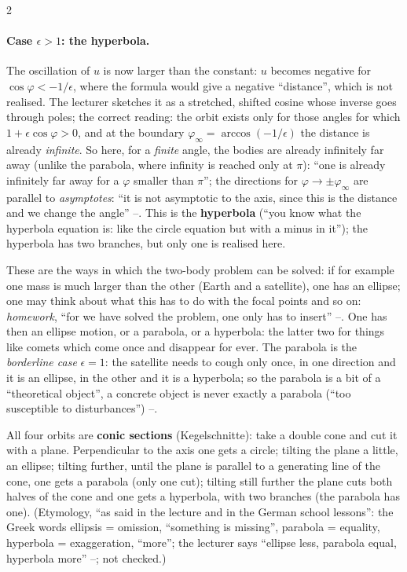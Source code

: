 \begin{paracol}{2}
\paragraph{Case $\epsilon>1$: the hyperbola.} The oscillation of $u$ is now larger than the constant: $u$ becomes negative for $\cos\varphi<-1/\epsilon$, where the formula would give a negative ``distance'', which is not realised. The lecturer sketches it as a stretched, shifted cosine whose inverse goes through poles; the correct reading: the orbit exists only for those angles for which $1+\epsilon\cos\varphi>0$, and at the boundary $\varphi_\infty=\arccos(-1/\epsilon)$ the distance is already \emph{infinite}.
So here, for a \emph{finite} angle, the bodies are already infinitely far away (unlike the parabola, where infinity is reached only at $\pi$): ``one is already infinitely far away for a $\varphi$ smaller than $\pi$''; the directions for $\varphi\to\pm\varphi_\infty$ are parallel to \emph{asymptotes}: ``it is not asymptotic to the axis, since this is the distance and we change the angle'' --. This is the \textbf{hyperbola} (``you know what the hyperbola equation is: like the circle equation but with a minus in it''); the hyperbola has two branches, but only one is realised here.

These are the ways in which the two-body problem can be solved: if for example one mass is much larger than the other (Earth and a satellite), one has an ellipse; one may think about what this has to do with the focal points and so on: \emph{homework}, ``for we have solved the problem, one only has to insert'' --. One has then an ellipse motion, or a parabola, or a hyperbola: the latter two for things like comets which come once and disappear for ever. The parabola is the \emph{borderline case} $\epsilon=1$: the satellite needs to cough only once, in one direction and it is an ellipse, in the other and it is a hyperbola; so the parabola is a bit of a ``theoretical object'', a concrete object is never exactly a parabola (``too susceptible to disturbances'') --.

\begin{secondary}\label{sec:tb-conics}
All four orbits are \textbf{conic sections} (Kegelschnitte): take a double cone and cut it with a plane. Perpendicular to the axis one gets a circle; tilting the plane a little, an ellipse; tilting further, until the plane is parallel to a generating line of the cone, one gets a parabola (only one cut); tilting still further the plane cuts both halves of the cone and one gets a hyperbola, with two branches (the parabola has one).
(Etymology, ``as said in the lecture and in the German school lessons'': the Greek words ellipsis = omission, ``something is missing'', parabola = equality, hyperbola = exaggeration, ``more''; the lecturer says ``ellipse less, parabola equal, hyperbola more'' --; not checked.)


\end{secondary}
\end{paracol}
